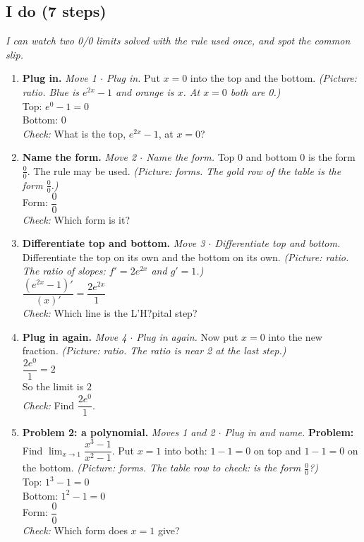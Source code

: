 \documentclass[11pt]{article}
\begin{document}
\subsection*{I do (7 steps)}
\textit{I can watch two 0/0 limits solved with the rule used once, and spot the common slip.}\par
\begin{enumerate}
\item \textbf{Plug in.} \textit{Move 1 $\cdot$ Plug in.} Put $x=0$ into the top and the bottom. \textit{(Picture: ratio. Blue is $e^{2x}-1$ and orange is $x$. At $x=0$ both are 0.)}\\ Top: $e^0-1=0$\\ Bottom: $0$\\ \textit{Check:} What is the top, $e^{2x}-1$, at $x=0$? 
\item \textbf{Name the form.} \textit{Move 2 $\cdot$ Name the form.} Top 0 and bottom 0 is the form $\frac00$. The rule may be used. \textit{(Picture: forms. The gold row of the table is the form $\frac00$.)}\\ Form: $\dfrac00$\\ \textit{Check:} Which form is it? 
\item \textbf{Differentiate top and bottom.} \textit{Move 3 $\cdot$ Differentiate top and bottom.} Differentiate the top on its own and the bottom on its own. \textit{(Picture: ratio. The ratio of slopes: $f'=2e^{2x}$ and $g'=1$.)}\\ $\dfrac{(e^{2x}-1)'}{(x)'}=\dfrac{2e^{2x}}{1}$\\ \textit{Check:} Which line is the L'H?pital step? 
\item \textbf{Plug in again.} \textit{Move 4 $\cdot$ Plug in again.} Now put $x=0$ into the new fraction. \textit{(Picture: ratio. The ratio is near 2 at the last step.)}\\ $\dfrac{2e^0}{1}=2$\\ So the limit is $2$\\ \textit{Check:} Find $\dfrac{2e^{0}}{1}$. 
\item \textbf{Problem 2: a polynomial.} \textit{Moves 1 and 2 $\cdot$ Plug in and name.} \textbf{Problem:} Find $\displaystyle\lim_{x\to1}\dfrac{x^3-1}{x^2-1}$. Put $x=1$ into both: $1-1=0$ on top and $1-1=0$ on the bottom. \textit{(Picture: forms. The table row to check: is the form $\frac00$?)}\\ Top: $1^3-1=0$\\ Bottom: $1^2-1=0$\\ Form: $\dfrac00$\\ \textit{Check:} Which form does $x=1$ give? 

\end{enumerate}
\end{document}
